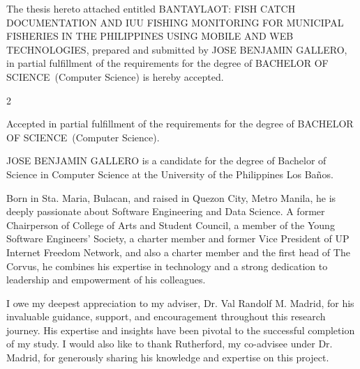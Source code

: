\documentclass{icsthesis}
\renewcommand{\TITLE}{BANTAYLAOT: FISH CATCH DOCUMENTATION AND IUU FISHING MONITORING FOR MUNICIPAL FISHERIES IN THE PHILIPPINES USING MOBILE AND WEB TECHNOLOGIES}
\renewcommand{\AUTHOR}{JOSE BENJAMIN GALLERO}
\renewcommand{\DEGREE}{BACHELOR OF SCIENCE}
\renewcommand{\MAJOR}{Computer Science}
\begin{document}
	
	\begin{frontmatter}
		\maketitle
				
		\begin{approvalpage}
			The thesis hereto attached entitled \TITLE , prepared and submitted by \AUTHOR , in partial fulfillment of the requirements for the degree of \DEGREE\ (\MAJOR) is hereby accepted.
			
			\begin{multicols}{2}
				\centering
				\columnbreak
			\end{multicols}
			
			Accepted in partial fulfillment of the requirements for the degree of \DEGREE\ (\MAJOR). 
		\end{approvalpage}
		
		\begin{biosketch}
			{\AUTHOR} is  a candidate for the degree of Bachelor of Science in Computer Science at the University of the Philippines Los Baños. 
            
            Born in Sta. Maria, Bulacan, and raised in Quezon City, Metro Manila, he is deeply passionate about Software Engineering and Data Science. A former Chairperson of College of Arts and Student Council, a member of the Young Software Engineers' Society, a charter member and former Vice President of UP Internet Freedom Network, and also a charter member and the first head of The Corvus, he combines his expertise in technology and a strong dedication to leadership and empowerment of his colleagues.
			
			\addauthorsignaturefield
		\end{biosketch}	
		
		\begin{acknowledgement}			
            I owe my deepest appreciation to my adviser, Dr. Val Randolf M. Madrid, for his invaluable guidance, support, and encouragement throughout this research journey. His expertise and insights have been pivotal to the successful completion of my study. I would also like to thank Rutherford, my co-advisee under Dr. Madrid, for generously sharing his knowledge and expertise on this project.


\end{acknowledgement}
\end{frontmatter}
\end{document}
